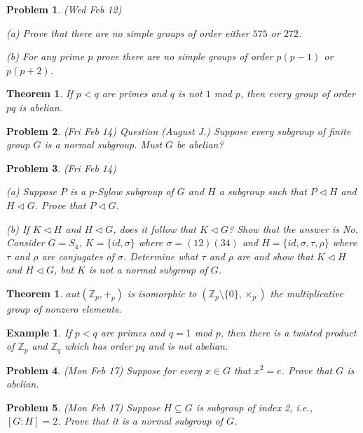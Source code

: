 \documentclass[12pt]{article}
\def\si{\sigma}
\def\zz{{\mathbb Z}}
\def\si{\sigma}
\def\su{\subseteq}
\def\normal{\triangleleft}
\def\sm{\setminus}
\newtheorem{thm}[theorem]{Theorem}
\newtheorem{examp}[theorem]{Example}
\newtheorem{prob}{Problem}
\begin{document}
\begin{prob}(Wed Feb 12)
\par (a) Prove that there are no simple groups of order
either $575$ or $272$.
\par (b) For any prime $p$ prove there are no simple groups
of order $p(p-1)$ or $p(p+2)$.
\end{prob}

\begin{thm}
If $p<q$ are primes and $q$ is not $1$ mod $p$, then every
group of order $pq$ is abelian.
\end{thm}

\begin{prob}
(Fri Feb 14) Question (August J.) Suppose every subgroup
of finite group $G$ is a normal subgroup.  Must $G$ be abelian?
\end{prob}

\begin{prob}
(Fri Feb 14)
\par (a) Suppose $P$ is a $p$-Sylow subgroup of $G$ and
$H$ a subgroup such that $P\normal H$ and $H\normal G$.
Prove that $P\normal G$.
\par (b) If $K\normal H$ and $H\normal G$, does it follow
that $K\normal G$?  Show that the answer is No.
Consider $G=S_4$, $K=\{id,\si\}$ where $\si=(12)(34)$ and
$H=\{id,\si,\tau,\rho\}$ where $\tau$ and $\rho$ are conjugates
of $\si$.  Determine what $\tau$ and $\rho$ are and show
that $K\normal H$ and $H\normal G$, but $K$ is not a normal subgroup
of  $G$.
\end{prob}

\begin{thm}
$aut(\zz_p,+_p)$ is isomorphic to 
$(\zz_p\sm\{0\},\times_p)$ the multiplicative group
of nonzero elements.
\end{thm}

\begin{examp}
If $p<q$ are primes and $q=1$ mod $p$, then there is a twisted product of
$\zz_p$ and $\zz_q$ which has order $pq$ and is not abelian.
\end{examp}

\begin{prob}
(Mon Feb 17) Suppose for every $x\in G$ that $x^2=e$.  Prove
that $G$ is abelian.
\end{prob}

\begin{prob}
(Mon Feb 17) Suppose $H\su G$ is subgroup of index 2, i.e., 
$[G:H]=2$.  Prove that it is a normal subgroup of $G$.
\end{prob}
\end{document}
